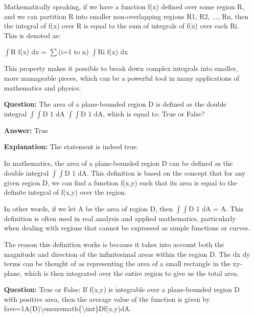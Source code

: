 \documentclass{article}
\begin{document}
Mathematically speaking, if we have a function f(x) defined over some region R, and we can partition R into smaller non-overlapping regions R1, R2, ..., Rn, then the integral of f(x) over R is equal to the sum of integrals of f(x) over each Ri. This is denoted as:

\ensuremath{\int}R f(x) dx = \ensuremath{\sum}(i=1 to n) \ensuremath{\int}Ri f(x) dx

This property makes it possible to break down complex integrals into smaller, more manageable pieces, which can be a powerful tool in many applications of mathematics and physics.
                
                \vspace{0.5cm} 
        
            
                \textbf {Question:} The area of a plane-bounded region D is defined as the double integral \ensuremath{\int}\ensuremath{\int}D 1 dA \ensuremath{\int}\ensuremath{\int}D 1 dA, which is equal to: True or False?
                
                \textbf{Answer:} True

                \textbf{Explanation:} The statement is indeed true.

In mathematics, the area of a plane-bounded region D can be defined as the double integral \ensuremath{\int}\ensuremath{\int}D 1 dA. This definition is based on the concept that for any given region D, we can find a function f(x,y) such that its area is equal to the definite integral of f(x,y) over the region.

In other words, if we let A be the area of region D, then \ensuremath{\int}\ensuremath{\int}D 1 dA = A. This definition is often used in real analysis and applied mathematics, particularly when dealing with regions that cannot be expressed as simple functions or curves.

The reason this definition works is because it takes into account both the magnitude and direction of the infinitesimal areas within the region D. The dx dy terms can be thought of as representing the area of a small rectangle in the xy-plane, which is then integrated over the entire region to give us the total area.
                
                \vspace{0.5cm} 
        
            
                \textbf {Question:} True or False: If f(x,y) is integrable over a plane-bounded region D with positive area, then the average value of the function is given by fave=1A(D){\textbackslash}ensuremath\{{\textbackslash}iint\}Df(x,y)dA.
                
\end{document}
